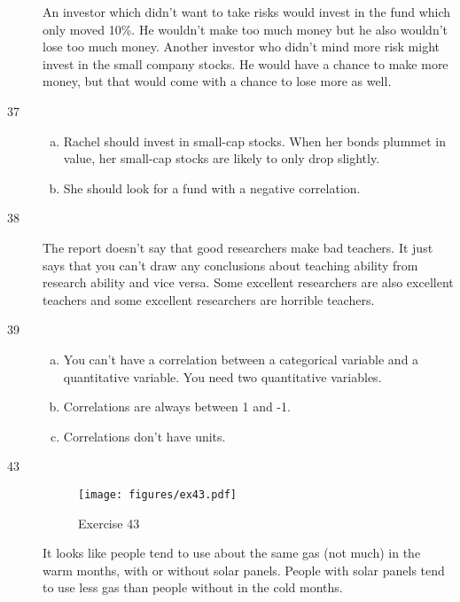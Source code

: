 \documentclass[letterpaper, landscape]{exam}
\begin{document}
\begin{description}
        An investor which didn't want to take risks would invest in the fund
        which only moved 10\%.  He wouldn't make too much money but he also
        wouldn't lose too much money.  Another investor who didn't mind more
        risk might invest in the small company stocks.  He would have a chance
        to make more money, but that would come with a chance to lose more as
        well.

      \item[37]
        \begin{enumerate}[(a)]
          \item Rachel should invest in small-cap stocks.  When her bonds
            plummet in value, her small-cap stocks are likely to only drop
            slightly.

          \item She should look for a fund with a negative correlation.
        \end{enumerate}

      \item[38]
        The report doesn't say that good researchers make bad teachers.  It just
        says that you can't draw any conclusions about teaching ability from
        research ability and vice versa.  Some excellent researchers are also
        excellent teachers and some excellent researchers are horrible teachers.

      \item[39]
        \begin{enumerate}[(a)]
          \item You can't have a correlation between a categorical variable and
            a quantitative variable.  You need two quantitative variables.

          \item Correlations are always between 1 and -1.

          \item Correlations don't have units.
        \end{enumerate}

      \item[43]
        \begin{figure}[H]
          \centering
          \texttt{[image: figures/ex43.pdf]}
          \caption{Exercise 43}
        \end{figure}

        It looks like people tend to use about the same gas (not much) in the
        warm months, with or without solar panels.  People with solar panels
        tend to use less gas than people without in the cold months.


\end{description}
\end{document}
